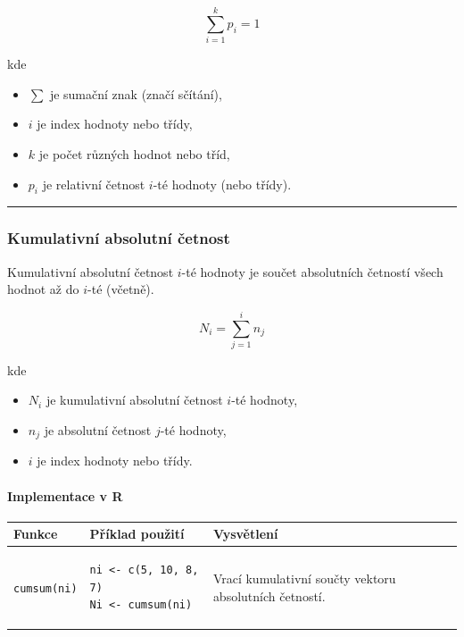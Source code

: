 \documentclass[a4paper, 11pt]{article}
\newenvironment{funkcedict}
{%
  \begingroup
  \renewcommand{\arraystretch}{1.4}%
  \lstset{basicstyle=\ttfamily\small, columns=fullflexible}%
  \setlength{\tabcolsep}{4pt}%
  \begin{tabular}{p{0.19\textwidth} p{0.38\textwidth} p{0.30\textwidth}}
  \textbf{Funkce} & \textbf{Příklad použití} & \textbf{Vysvětlení} \\
  \midrule
}
{%
  \end{tabular}%
  \endgroup
}
\begin{document}
\begin{equation*}
	\sum_{i=1}^{k} p_i = 1
\end{equation*}

kde

\begin{itemize}[noitemsep]
	\item $\sum$ je sumační znak (značí sčítání),
	\item $i$ je index hodnoty nebo třídy,
	\item $k$ je počet různých hodnot nebo tříd,
	\item $p_i$ je relativní četnost $i$-té hodnoty (nebo třídy).
\end{itemize}

\noindent\hrule\medskip

\subsubsection{Kumulativní absolutní četnost}

Kumulativní absolutní četnost $i$-té hodnoty je součet absolutních četností
všech hodnot až do $i$-té (včetně).

\begin{equation*}
	N_i = \sum_{j=1}^{i} n_j
\end{equation*}

kde

\begin{itemize}[noitemsep]
	\item $N_i$ je kumulativní absolutní četnost $i$-té hodnoty,
	\item $n_j$ je absolutní četnost $j$-té hodnoty,
	\item $i$ je index hodnoty nebo třídy.
\end{itemize}

\paragraph{Implementace v R}\mbox{}\par

\begin{funkcedict}

	\texttt{cumsum(ni)} &
	\begin{lstlisting}
ni <- c(5, 10, 8, 7)
Ni <- cumsum(ni)
	\end{lstlisting}
	&
	Vrací kumulativní součty vektoru absolutních četností.
	\\

\end{funkcedict}
\end{document}
